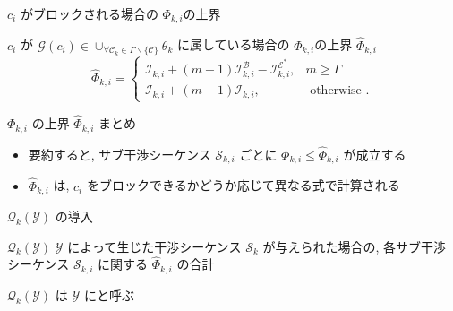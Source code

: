 \begin{frame}{$c_{i}$ がブロックされる場合の $\Phi_{k, i}$の上界}
    \begin{definition}
        $c_{i}$ が $\mathcal{G}\left(c_{i}\right) \in \cup_{\forall \mathcal{C}_{k} \in \Gamma \backslash\{\mathcal{C}\}} \theta_{k}$ に属している場合の $\Phi_{k, i}$の上界 $\hat{\Phi}_{k, i}$
        \begin{equation*}
            \hat{\Phi}_{k, i}=\left\{\begin{array}{lr}
                \mathcal{I}_{k, i}+(m-1) \mathcal{I}_{k, i}^{\mathcal{B}}-\mathcal{I}_{k, i}^{\mathcal{E}^{*}}, & m \geq \Gamma         \\
                \mathcal{I}_{k, i}+(m-1) \mathcal{I}_{k, i},                                                    & \text { otherwise } .
            \end{array}\right.
        \end{equation*}
    \end{definition}
\end{frame}

\begin{frame}{$\Phi_{k, i}$ の上界 $\hat{\Phi}_{k, i}$ まとめ}
    \begin{itemize}
        \item 要約すると, サブ干渉シーケンス $\mathcal{S}_{k, i}$ ごとに $\Phi_{k, i} \leq \hat{\Phi}_{k, i}$ が成立する
        \item $\hat{\Phi}_{k, i}$ は, $c_{i}$ をブロックできるかどうか応じて異なる式で計算される
    \end{itemize}
\end{frame}

\begin{frame}{$\mathcal{Q}_{k}(\mathcal{Y})$ の導入}
    \begin{block}{$\mathcal{Q}_{k}(\mathcal{Y})$}
        $\mathcal{Y}$ によって生じた干渉シーケンス $\mathcal{S}_{k}$ が与えられた場合の, 各サブ干渉シーケンス $\mathcal{S}_{k, i}$ に関する $\hat{\Phi}_{k, i}$ の合計
    \end{block}
    \vspace{5mm}
    $\mathcal{Q}_{k}(\mathcal{Y})$ は $\mathcal{Y}$ にと呼ぶ
\end{frame}

